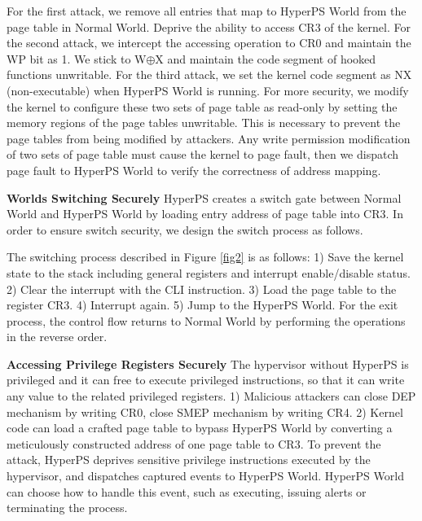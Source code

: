 \documentclass[conference]{IEEEtran}
\begin{document}
For the first attack, %
we remove all entries that map to HyperPS World from the page table in Normal World. Deprive the ability to access CR3 of the kernel. %
For the second attack, we intercept the accessing operation to CR0 and maintain the WP bit as 1. We stick to W$\oplus${X} and maintain the code segment of hooked functions unwritable.
For the third attack, we set the kernel code segment as NX (non-executable) when HyperPS World is running. For more security, we modify the kernel to configure these two sets of page table as read-only by setting the memory regions of the page tables unwritable. This is necessary to prevent the page tables from being modified by attackers. Any write permission modification of two sets of page table must cause the kernel to page fault, then we dispatch page fault to HyperPS World to verify the correctness of address mapping. 


\textbf{Worlds Switching Securely}
HyperPS creates a switch gate between Normal World and HyperPS World by loading entry address of page table into CR3.
In order to ensure switch security, we design the switch process as follows.

The switching process described in Figure \ref{fig2} is as follows: 1) Save the kernel state to the stack including general registers and interrupt enable/disable status. 2) Clear the interrupt with the CLI instruction. 3) Load the page table to the register CR3. 4) Interrupt again. 5) Jump to the HyperPS World. For the exit process, the control flow returns to Normal World by performing the operations in the reverse order.


\textbf{Accessing Privilege Registers Securely}
The hypervisor without HyperPS is privileged and it can free to execute privileged instructions, so that it can write any value to the related privileged registers. 1) Malicious attackers can close DEP mechanism by writing CR0, close SMEP mechanism by writing CR4. 2) Kernel code can load a crafted page table to bypass HyperPS World by converting a meticulously constructed address of one page table to CR3.
To prevent the attack, HyperPS deprives sensitive privilege instructions executed by the hypervisor, and dispatches captured events to HyperPS World. HyperPS World can choose how to handle this event, such as executing, issuing alerts or terminating the process. 
\end{document}
